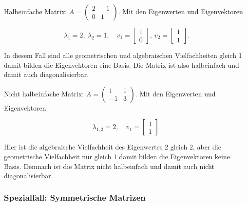Halbeinfache Matrix: \( A = \begin{pmatrix} 2 & -1 \\ 0 & 1 \end{pmatrix} \). Mit den Eigenwerten und Eigenvektoren

\vspace{1\baselineskip}

\begin{equation*}
    \lambda_1 = 2, \ \lambda_2 = 1, \quad v_1 = \begin{bmatrix} 1 \\ 0 \end{bmatrix}, \ v_2 = \begin{bmatrix} 1 \\ 1 \end{bmatrix}.
\end{equation*}

In diesem Fall sind alle geometrischen und algebraischen Vielfachheiten gleich 1 damit bilden die Eigenvektoren eine Basis. Die Matrix ist also halbeinfach und damit auch diagonalisierbar.

\vspace{1\baselineskip}

Nicht halbeinfache Matrix: \( A = \begin{pmatrix} 1 & 1 \\ -1 & 3 \end{pmatrix} \). Mit den Eigenwerten und Eigenvektoren

\vspace{1\baselineskip}

\begin{equation*}
    \lambda_{1,2} = 2, \quad v_1 = \begin{bmatrix} 1 \\ 1 \end{bmatrix}.
\end{equation*}

Hier ist die algebraische Vielfachheit des Eigenwertes 2 gleich 2, aber die geometrische Vielfachheit nur gleich 1 damit bilden die Eigenvektoren keine Basis. Demnach ist die Matrix nicht halbeinfach und damit auch nicht diagonalisierbar.

\subsubsection{Spezialfall: Symmetrische Matrizen} \( \ \)

\vspace{0.5\baselineskip}

